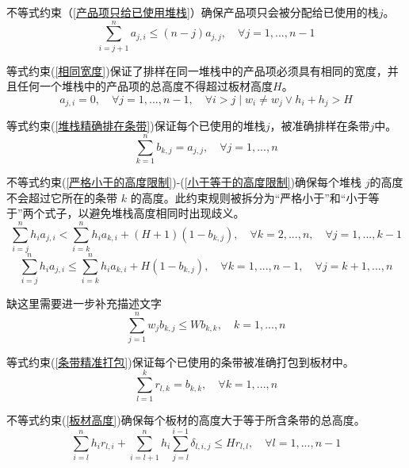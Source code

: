 \documentclass[bwprint]{gmcmthesis}
\begin{document}
不等式约束（\ref{产品项只给已使用堆栈}）确保产品项只会被分配给已使用的栈$j$。
\begin{equation}
   \sum_{i=j+1}^{n}  a_{j,i} \le (n-j)a_{j,j},\quad \forall j=1,...,n-1  \label{产品项只给已使用堆栈}
\end{equation}

等式约束(\ref{相同宽度})保证了排样在同一堆栈中的产品项必须具有相同的宽度，并且任何一个堆栈中的产品项的总高度不得超过板材高度$H$。
\begin{equation}
     a_{j,i}=0, \quad \forall j=1,...,n-1,\quad  \forall i>j \mid w_i \neq w_j \vee h_i+h_j>H \label{相同宽度}
 \end{equation}

 等式约束(\ref{堆栈精确排在条带})保证每个已使用的堆栈$j$，被准确排样在条带$j$中。
\begin{equation}
    \sum_{k=1}^{n}  b_{k,j} =a_{j,j},\quad \forall j=1,...,n  \label{堆栈精确排在条带}
\end{equation}

不等式约束(\ref{严格小于的高度限制})-(\ref{小于等于的高度限制})确保每个堆栈 $j$的高度不会超过它所在的条带 $k$ 的高度。此约束规则被拆分为“严格小于”和“小于等于”两个式子，以避免堆栈高度相同时出现歧义。
\begin{equation}
    \sum_{i=j}^{n} h_ia_{j,i}<\sum_{i=k}^n h_i a_{k,i}+(H+1)(1-b_{k,j}),\quad  \forall  k=2,...,n,\quad  \forall j=1,...,k-1 \label{严格小于的高度限制}
\end{equation}
\begin{equation}
    \sum_{i=j}^{n} h_ia_{j,i} \le \sum_{i=k}^n h_i a_{k,i}+H(1-b_{k,j}), \quad  \forall k=1,...,n-1, \quad \forall j=k+1,...,n \label{小于等于的高度限制}
\end{equation}

缺这里需要进一步补充描述文字
\begin{equation}
    \sum_{j=1}^{n} w_j b_{k,j} \le W b_{k,k}, \quad k=1,...,n \label{宽度限制}
\end{equation}

等式约束(\ref{条带精准打包})保证每个已使用的条带被准确打包到板材中。
\begin{equation}
    \sum_{l=1}^{k} r_{l,k} = b_{k,k}, \quad \forall k=1,...,n \label{条带精准打包}
\end{equation}

不等式约束(\ref{板材高度})确保每个板材的高度大于等于所含条带的总高度。
\begin{equation}
    \sum_{i=l}^{n} h_i r_{l,i} +\sum_{i=l+1}^{n} h_i \sum_{j=l}^{i-1} \delta_{l,i,j} \le H r_{l,l}, \quad \forall l=1,...,n-1 \label{板材高度}
\end{equation}
\end{document}
